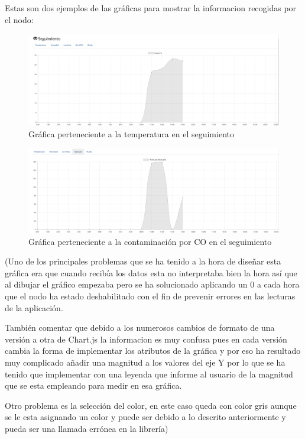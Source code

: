 Estas son dos ejemplos de las gráficas para mostrar la informacion recogidas por el nodo:

\begin{figure}[!h]
	\centering
	\includegraphics[width=0.9\linewidth]{figuras/nodereports3}
	\caption{Gráfica perteneciente a la temperatura en el seguimiento}
	\label{fig:nodereport}
\end{figure}

\begin{figure}[!h]
	\centering
	\includegraphics[width=0.9\linewidth]{figuras/node4}
	\caption{Gráfica perteneciente a la contaminación por CO en el seguimiento}
	\label{fig:nodereport}
\end{figure}

(Uno de los principales problemas que se ha tenido a la hora de diseñar esta gráfica era que cuando recibía los datos esta no interpretaba bien la hora así que al dibujar el gráfico empezaba pero se ha solucionado aplicando un 0 a cada hora que el nodo ha estado deshabilitado con el fin de prevenir errores en las lecturas de la aplicación.

También comentar que debido a los numerosos cambios de formato de una versión a otra de Chart.js la informacion es muy confusa pues en cada versión cambia la forma de implementar los atributos de la gráfica y por eso ha resultado muy complicado añadir una magnitud a los valores del eje Y por lo que se ha tenido que implementar con una leyenda que informe al usuario de la magnitud que se esta empleando para medir en esa gráfica.

Otro problema es la selección del color, en este caso queda con color gris aunque se le esta asignando un color y puede ser debido a lo descrito anteriormente y pueda ser una llamada errónea en la librería)

